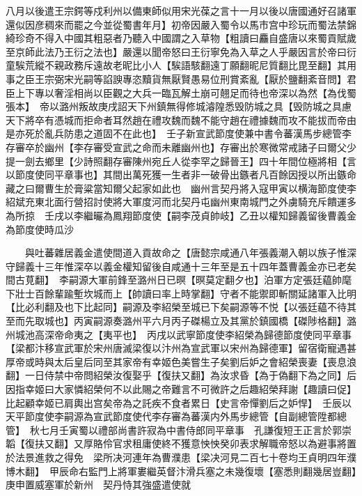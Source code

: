 八月以後遣王宗鍔等戍利州以備東師似用宋光葆之言十一月以後以唐國通好召諸軍還似因彦稠來而罷之今並從蜀書年月】初帝因嚴入蜀令以馬市宫中珍玩而蜀法禁錦綺珍奇不得入中國其粗惡者乃聽入中國謂之入草物【粗讀曰麤自盛唐以來蜀貢賦歲至京師此法乃王衍之法也】嚴還以聞帝怒曰王衍寧免為入草之人乎嚴因言於帝曰衍童騃荒縱不親政務斥遠故老昵比小人【騃語駭翻遠丁願翻昵尼質翻比毘至翻】其用事之臣王宗弼宋光嗣等諂諛專恣黷貨無厭賢愚易位刑賞紊亂【厭於鹽翻紊音問】君臣上下專以奢淫相尚以臣觀之大兵一臨瓦解土崩可翹足而待也帝深以為然【為伐蜀張本】　帝以潞州叛故庚戌詔天下州鎮無得修城濬隍悉毁防城之具【毁防城之具慮天下將卒有憑城而拒命者耳然趙在禮攻魏而魏不能守趙在禮據魏而攻不能拔而帝由是亦死於亂兵防患之道固不在此也】　壬子新宣武節度使兼中書令蕃漢馬步總管李存審卒於幽州【李存審受宣武之命而未離幽州也】存審出於寒微常戒諸子曰爾父少提一劍去鄉里【少詩照翻存審陳州宛丘人從李罕之歸晉王】四十年間位極將相【言以節度使同平章事也】其間出萬死獲一生者非一破骨出鏃者凡百餘因授以所出鏃命藏之曰爾曹生於膏粱當知爾父起家如此也　幽州言契丹將入寇甲寅以横海節度使李紹斌充東北面行營招討使將大軍度河而北契丹屯幽州東南城門之外虜騎充斥饋運多為所掠　壬戌以李繼曮為鳳翔節度使【嗣李茂貞帥岐】乙丑以權知歸義留後曹義金為節度使時瓜沙

　　與吐蕃雜居義金遣使間道入貢故命之【唐懿宗咸通八年張義潮入朝以族子惟深守歸義十三年惟深卒以義金權知留後自咸通十三年至是五十四年蓋曹義金亦已老矣間古莧翻】　李嗣源大軍前鋒至潞州日已暝【暝莫定翻夕也】泊軍方定張廷藴帥麾下壯士百餘輩踰塹坎城而上【帥讀曰率上時掌翻】守者不能禦即斬關延諸軍入比明【比必利翻及也下比起同】嗣源及李紹榮至城已下矣嗣源等不悦【以張廷藴不待其至而先取城也】丙寅嗣源奏潞州平六月丙子磔楊立及其黨於鎮國橋【磔陟格翻】潞州城池高深帝命夷之【夷平也】　丙戌以武寧節度使李紹榮為歸德節度使同平章事【梁都汴移宣武軍於宋州唐滅梁復以汴州為宣武軍以宋州為歸德軍】留宿衛寵遇甚厚帝或時與太后皇后同至其家帝有幸姬色美嘗生子矣劉后妒之會紹榮喪妻【喪息浪翻】一日侍禁中帝問紹榮汝復娶乎【復扶又翻】為汝求昏【為于偽翻下為之同】后因指幸姬曰大家憐紹榮何不以此賜之帝難言不可微許之后趣紹榮拜謝【趣讀曰促】比起顧幸姬已肩輿出宫矣帝為之託疾不食者累日【史言帝憚劉后之妒悍】　壬辰以天平節度使李嗣源為宣武節度使代李存審為蕃漢内外馬步總管【自副總管陞都總管】　秋七月壬寅蜀以禮部尚書許寂為中書侍郎同平章事　孔謙復短王正言於郭崇韜【復扶又翻】又厚賂伶官求租庸使終不獲意怏怏癸卯表求解職帝怒以為避事將置於法景進救之得免　梁所决河連年為曹濮患【梁决河見二百七十卷均王貞明四年濮博木翻】　甲辰命右監門上將軍婁繼英督汴滑兵塞之未幾復壞【塞悉則翻幾居豈翻】庚申置威塞軍於新州　契丹恃其強盛遣使就

